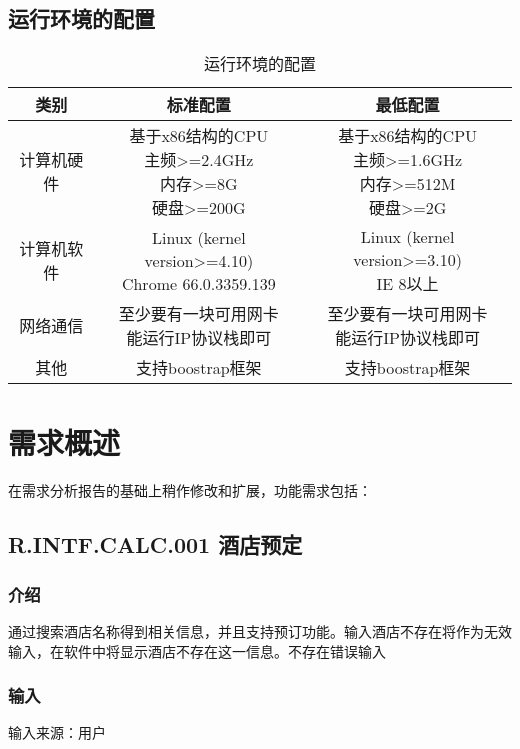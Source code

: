 \subsection{运行环境的配置}
\begin{table}[htbp]
\centering
\caption{运行环境的配置} \label{tab:operation-environment}
\begin{tabular}{|c|c|c|}
    \hline
    类别 & 标准配置 & 最低配置 \\
    \hline
    计算机硬件 & \tabincell{c}{基于x86结构的CPU\\ 主频>=2.4GHz\\ 内存>=8G\\ 硬盘>=200G} & \tabincell{c}{基于x86结构的CPU\\ 主频>=1.6GHz\\ 内存>=512M\\ 硬盘>=2G} \\
    \hline
    计算机软件 & \tabincell{c}{Linux (kernel version>=4.10)\\ Chrome 66.0.3359.139} & \tabincell{c}{Linux (kernel version>=3.10)\\ IE 8以上} \\
    \hline
    网络通信 & \tabincell{c}{至少要有一块可用网卡\\ 能运行IP协议栈即可} & \tabincell{c}{至少要有一块可用网卡\\ 能运行IP协议栈即可} \\
    \hline
    其他 & 支持boostrap框架 & 支持boostrap框架 \\
    \hline

\end{tabular}
\end{table}

\section{需求概述}
在需求分析报告的基础上稍作修改和扩展，功能需求包括：

\subsection{R.INTF.CALC.001 酒店预定}
\subsubsection{介绍}
通过搜索酒店名称得到相关信息，并且支持预订功能。输入酒店不存在将作为无效输入，在软件中将显示酒店不存在这一信息。不存在错误输入
\subsubsection{输入}
		输入来源：用户

